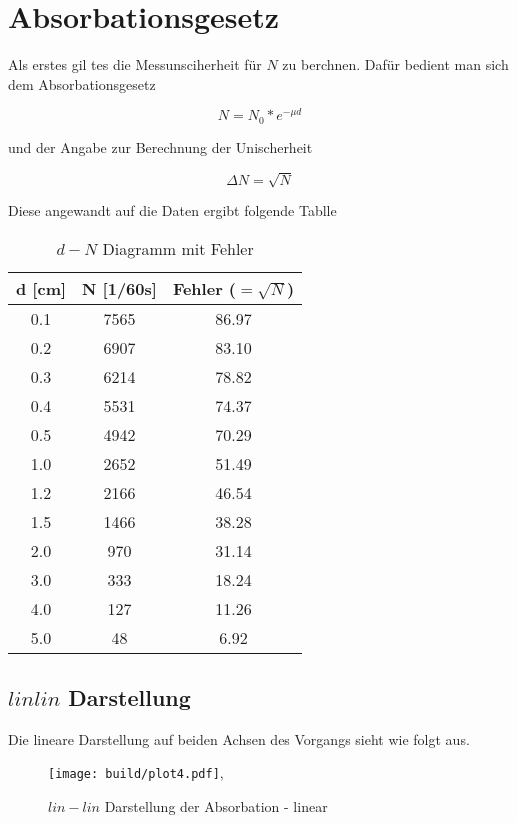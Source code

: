 \newpage
\section{Absorbationsgesetz}

Als erstes gil tes die Messunsciherheit für $N$ zu berchnen. Dafür bedient man sich dem Absorbationsgesetz

\begin{equation}
    N=N_0 * e^{-\mu d}
\end{equation}

 und der Angabe zur Berechnung der Unischerheit

\begin{equation}
\label{eq:fehler}
   \Delta N= \sqrt{N}
\end{equation}

Diese angewandt auf die Daten ergibt folgende Tablle

\begin{table}
    \centering
    \caption{$d-N$ Diagramm mit Fehler}
    \begin{tabular}{c c c}
        \toprule
        d [cm] & N [1/60s] & Fehler ($=\sqrt{N}$)\\
        \midrule
        0.1 & 7565  & 86.97 \\
        0.2 & 6907  & 83.10 \\
        0.3 & 6214  & 78.82 \\
        0.4 & 5531  & 74.37 \\
        0.5 & 4942  & 70.29 \\
        1.0 & 2652  & 51.49 \\
        1.2 & 2166  & 46.54 \\
        1.5 & 1466  & 38.28 \\
        2.0 & 970  & 31.14 \\
        3.0 & 333  & 18.24 \\
        4.0 & 127  & 11.26 \\
        5.0 & 48  & 6.92 \\
        \bottomrule
    \end{tabular}
\end{table}

\subsection{$lin lin$ Darstellung} 
Die lineare Darstellung auf beiden Achsen des Vorgangs sieht wie folgt aus.
\begin{figure}
    \centering
    \texttt{[image: build/plot4.pdf]},
   \caption{$lin-lin$ Darstellung der Absorbation - linear}
   \label{fig:linlin}
\end{figure}

